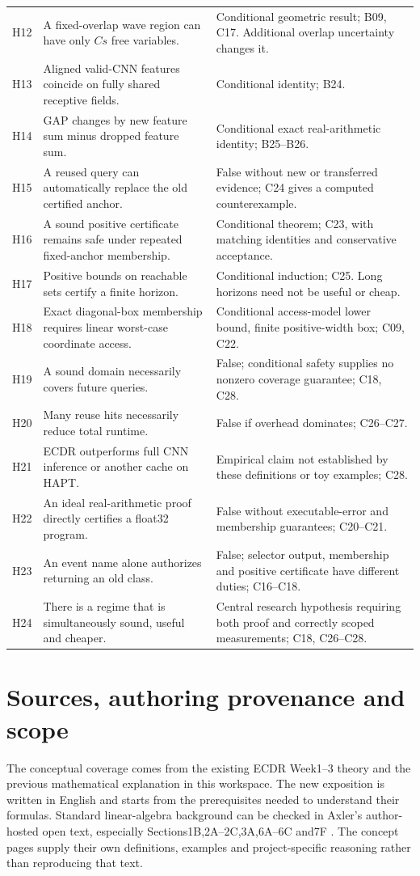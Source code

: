 \begin{longtable}{@{}P{0.9cm}P{7.2cm}P{7.1cm}@{}}
H12 & A fixed-overlap wave region can have only $Cs$ free variables. & Conditional geometric result; B09, C17. Additional overlap uncertainty changes it.\\
H13 & Aligned valid-CNN features coincide on fully shared receptive fields. & Conditional identity; B24.\\
H14 & GAP changes by new feature sum minus dropped feature sum. & Conditional exact real-arithmetic identity; B25--B26.\\
H15 & A reused query can automatically replace the old certified anchor. & False without new or transferred evidence; C24 gives a computed counterexample.\\
H16 & A sound positive certificate remains safe under repeated fixed-anchor membership. & Conditional theorem; C23, with matching identities and conservative acceptance.\\
H17 & Positive bounds on reachable sets certify a finite horizon. & Conditional induction; C25. Long horizons need not be useful or cheap.\\
H18 & Exact diagonal-box membership requires linear worst-case coordinate access. & Conditional access-model lower bound, finite positive-width box; C09, C22.\\
H19 & A sound domain necessarily covers future queries. & False; conditional safety supplies no nonzero coverage guarantee; C18, C28.\\
H20 & Many reuse hits necessarily reduce total runtime. & False if overhead dominates; C26--C27.\\
H21 & ECDR outperforms full CNN inference or another cache on HAPT. & Empirical claim not established by these definitions or toy examples; C28.\\
H22 & An ideal real-arithmetic proof directly certifies a float32 program. & False without executable-error and membership guarantees; C20--C21.\\
H23 & An event name alone authorizes returning an old class. & False; selector output, membership and positive certificate have different duties; C16--C18.\\
H24 & There is a regime that is simultaneously sound, useful and cheaper. & Central research hypothesis requiring both proof and correctly scoped measurements; C18, C26--C28.\\\bottomrule
\end{longtable}
\normalsize

\clearpage
\renewcommand{\conceptid}{Sources and evidence}
\section{Sources, authoring provenance and scope}
The conceptual coverage comes from the existing ECDR Week1--3 theory and
the previous mathematical explanation in this workspace. The new exposition
is written in English and starts from the prerequisites needed to understand
their formulas. Standard linear-algebra background can be checked in
Axler's author-hosted open text, especially Sections1B,2A--2C,3A,6A--6C
and7F \cite{axler}. The concept pages supply their own definitions,
examples and project-specific reasoning rather than reproducing that text.

